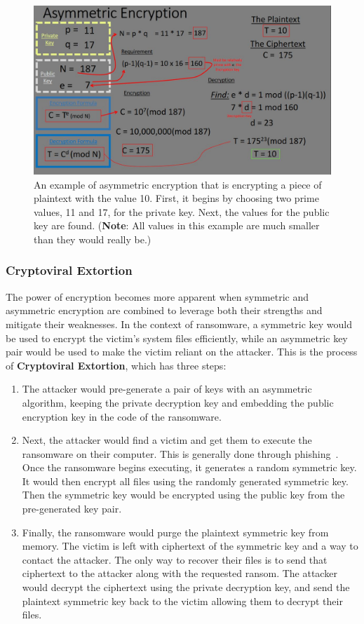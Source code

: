 \documentclass{IEEEtran}
\begin{document}
\begin{figure}[h]
\includegraphics[width=\linewidth]{ae-ex.JPG}
  \caption{An example of asymmetric encryption that is encrypting a piece of plaintext with the value 10. First, it begins by choosing two prime values, 11 and 17, for the private key. Next, the values for the public key are found. (\textbf{Note}: All values in this example are much smaller than they would really be.)}
  \label{fig:asymenc1}
\end{figure}

\subsubsection{Cryptoviral Extortion}\label{crypext}

The power of encryption becomes more apparent when symmetric and asymmetric encryption are combined to leverage both their strengths and mitigate their weaknesses. In the context of ransomware, a symmetric key would be used to encrypt the victim's system files efficiently, while an asymmetric key pair would be used to make the victim reliant on the attacker. This is the process of \textbf{Cryptoviral Extortion}, which has three steps: 
\begin{enumerate}
    \item The attacker would pre-generate a pair of keys with an asymmetric algorithm, keeping the private decryption key and embedding the public encryption key in the code of the ransomware.

    \item Next, the attacker would find a victim and get them to execute the ransomware on their computer. This is generally done through phishing~\cite{RN28}. Once the ransomware begins executing, it generates a random symmetric key. It would then encrypt all files using the randomly generated symmetric key. Then the symmetric key would be encrypted using the public key from the pre-generated key pair.
 
    \item  Finally, the ransomware would purge the plaintext symmetric key from memory. The victim is left with ciphertext of the symmetric key and a way to contact the attacker. The only way to recover their files is to send that ciphertext to the attacker along with the requested ransom. The attacker would decrypt the ciphertext using the private decryption key, and send the plaintext symmetric key back to the victim allowing them to decrypt their files.
\end{enumerate}
\end{document}
